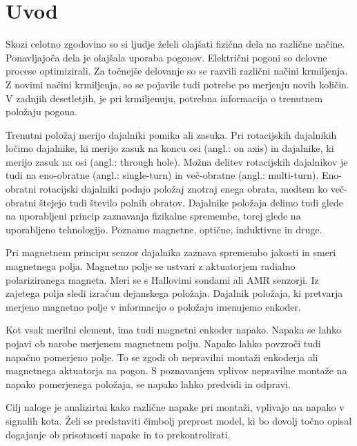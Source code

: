 \chapter{Uvod} \label{uvod}

Skozi celotno zgodovino so si ljudje želeli olajšati fizična dela na različne načine. Ponavljajoča dela je olajšala uporaba pogonov. Električni pogoni so delovne procese optimizirali. Za točnejše delovanje so se razvili različni načini krmiljenja. Z novimi načini krmiljenja, so se pojavile tudi potrebe po merjenju novih količin. V zadnjih desetletjih, je pri krmiljenuju, potrebna informacija o trenutnem položaju pogona.

Trenutni položaj merijo dajalniki pomika ali zasuka\cite{uporabaSenzorjev}. Pri rotacijskih dajalnikih ločimo dajalnike, ki merijo zasuk na koncu osi (angl.: on axis) in dajalnike, ki merijo zasuk na osi (angl.: through hole). Možna delitev rotacijskih dajalnikov je tudi na eno-obratne (angl.: single-turn) in več-obratne (angl.: multi-turn). Eno-obratni rotacijski dajalniki podajo položaj znotraj enega obrata, medtem ko več-obratni štejejo tudi število polnih obratov. Dajalnike položaja delimo tudi glede na uporabljeni princip zaznavanja fizikalne
spremembe, torej glede na uporabljeno tehnologijo. Poznamo magnetne, optične,
induktivne in druge\cite{killer}.

Pri magnetnem principu senzor dajalnika zaznava spremembo jakosti in smeri
magnetnega polja. 
Magnetno polje se ustvari z aktuatorjem radialno polariziranega magneta. Meri se s Hallovimi sondami ali AMR senzorji. Iz zajetega polja sledi izračun dejanskega položaja. Dajalnik položaja, ki pretvarja merjeno magnetno polje v informacijo o položaju imenujemo enkoder\cite{enkoder}.

Kot vsak merilni element, ima tudi magnetni enkoder napako. Napaka se lahko pojavi ob narobe merjenem magnetnem polju\cite{RLS3}. Napako lahko povzroči tudi napačno pomerjeno polje. To se zgodi ob nepravilni montaži enkoderja ali magnetnega aktuatorja na pogon. S poznavanjem vplivov nepravilne montaže na napako pomerjenega položaja, se napako lahko predvidi in odpravi.

Cilj naloge je analizirtai kako različne napake pri montaži, vplivajo na napako v signalih kota.
Želi se predstaviti čimbolj preprost model, ki bo dovolj točno opisal dogajanje ob prisotnosti napake in to prekontrolirati.


